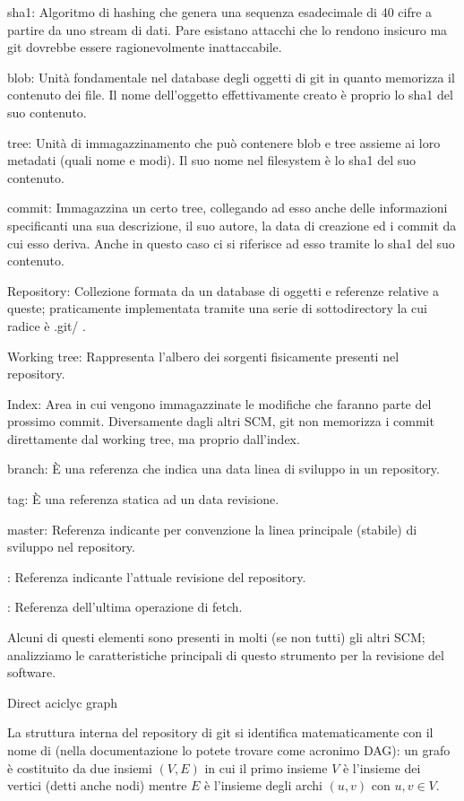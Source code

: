 \elemento sha1: Algoritmo di hashing che genera una sequenza esadecimale di 40
cifre a partire da uno stream di dati. Pare esistano attacchi che lo rendono
insicuro ma git dovrebbe essere ragionevolmente inattaccabile.

\elemento blob: Unit\`a fondamentale nel database degli oggetti di git in quanto
memorizza il contenuto dei file. Il nome dell'oggetto effettivamente creato \`e
proprio lo sha1 del suo contenuto.

\elemento tree: Unit\`a di immagazzinamento che pu\`o contenere blob e tree
assieme ai loro metadati (quali nome e modi). Il suo nome nel filesystem \`e lo
sha1 del suo contenuto.

\elemento commit: Immagazzina un certo tree, collegando ad esso anche delle
informazioni specificanti una sua descrizione, il suo autore, la data di
creazione ed i commit da cui esso deriva. Anche in questo caso ci si riferisce
ad esso tramite lo sha1 del suo contenuto.

\elemento Repository: Collezione formata da un database di oggetti e referenze
relative a queste; praticamente implementata tramite una serie di sottodirectory
la cui radice \`e \verbatim .git/ \endverbatim.

\elemento Working tree: Rappresenta l'albero dei sorgenti fisicamente presenti
nel repository.

\elemento Index: Area in cui vengono immagazzinate le modifiche che faranno
parte del prossimo commit. Diversamente dagli altri SCM, git non memorizza i
commit direttamente dal working tree, ma proprio dall'index.

\elemento branch: \`E una referenza che indica una data linea di sviluppo in un
repository.

\elemento tag: \`E una referenza statica ad un data revisione.

\elemento master: Referenza indicante per convenzione la linea principale
(stabile) di sviluppo nel repository.

\elemento {}: Referenza indicante l'attuale revisione del repository. 

\elemento {}: Referenza dell'ultima operazione di fetch. 
\medskip

Alcuni di questi elementi sono presenti in molti (se non tutti) gli altri SCM;
analizziamo le caratteristiche principali di questo strumento per la revisione
del software.

\sezione Direct aciclyc graph

La struttura interna del repository di git si identifica matematicamente con il
nome di  (nella documentazione lo potete
trovare come acronimo DAG): un grafo \`e costituito da due insiemi $(V,E)$ in
cui il primo insieme $V$ \`e l'insieme dei vertici (detti anche nodi) mentre
$E$ \`e l'insieme degli archi $(u,v)$ con $u,v\in V$.

